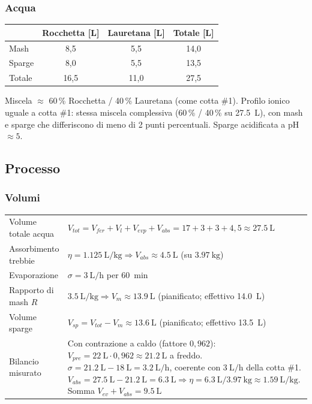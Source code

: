 \subsubsection*{Acqua}
\begin{tabularx}{\linewidth}{@{}lccc@{}}
\toprule
 & Rocchetta [\si{\liter}] & Lauretana [\si{\liter}] & Totale [\si{\liter}] \\
\midrule
Mash   & 8,5 & 5,5 & 14,0 \\
Sparge & 8,0 & 5,5 & 13,5 \\
\midrule
Totale & 16,5 & 11,0 & 27,5 \\
\bottomrule
\end{tabularx}

\medskip
\noindent Miscela $\approx$ 60\,\% Rocchetta / 40\,\% Lauretana (come cotta \#1). Profilo ionico uguale a cotta \#1: stessa miscela complessiva (60\,\% / 40\,\% su \SI{27,5}{\liter}), con mash e sparge che differiscono di meno di 2 punti percentuali. Sparge acidificata a pH $\approx 5$.

\subsection*{Processo}

\subsubsection*{Volumi}
\begin{tabularx}{\linewidth}{@{}lX@{}}
\toprule
Volume totale acqua & $V_{tot} = V_{fer} + V_l + V_{evp} + V_{abs} = 17 + 3 + 3 + 4{,}5 \approx \SI{27,5}{\liter}$ \\
Assorbimento trebbie & $\eta = \SI{1,125}{\liter\per\kilo\gram} \Rightarrow V_{abs} \approx \SI{4,5}{\liter}$ (su $\SI{3,97}{\kilo\gram}$) \\
Evaporazione & $\sigma = \SI{3}{\liter\per\hour}$ per \SI{60}{\minute} \\
Rapporto di mash $R$ & $\SI{3,5}{\liter\per\kilo\gram} \Rightarrow V_m \approx \SI{13,9}{\liter}$ (pianificato; effettivo \SI{14,0}{\liter}) \\
Volume sparge & $V_{sp} = V_{tot} - V_m \approx \SI{13,6}{\liter}$ (pianificato; effettivo \SI{13,5}{\liter}) \\
Bilancio misurato & Con contrazione a caldo (fattore $0{,}962$): $V_{pre} = \SI{22}{\liter} \cdot 0{,}962 \approx \SI{21,2}{\liter}$ a freddo. $\sigma = \SI{21,2}{\liter} - \SI{18}{\liter} = \SI{3,2}{\liter\per\hour}$, coerente con $\SI{3}{\liter\per\hour}$ della cotta \#1. $V_{abs} = \SI{27,5}{\liter} - \SI{21,2}{\liter} = \SI{6,3}{\liter} \Rightarrow \eta = \SI{6,3}{\liter} / \SI{3,97}{\kilo\gram} \approx \SI{1,59}{\liter\per\kilo\gram}$. Somma $V_{ev}+V_{abs} = \SI{9,5}{\liter}$ \\
\bottomrule
\end{tabularx}

